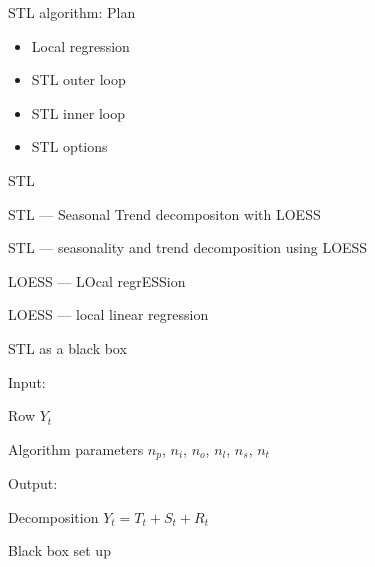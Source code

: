 
\begin{frame} %
	
	
\end{frame}



\begin{frame}{STL algorithm: Plan}
	\begin{itemize}[<+->]
		\item Local regression
		\item STL outer loop
		\item STL inner loop
		\item STL options
	\end{itemize}
	
\end{frame}


\begin{frame}{STL}
	
	\alert{STL} — Seasonal Trend decompositon with LOESS
	
	STL — seasonality and trend decomposition using LOESS
	
	\pause
	
	\alert{LOESS} — LOcal regrESSion
	
	LOESS — local linear regression
	
\end{frame}


\begin{frame}{STL as a black box}
	
	\alert{Input:}
	
	Row $Y_t$
	
	Algorithm parameters $n_p$, $n_i$, $n_o$, $n_l$, $n_s$, $n_t$
	
	\pause
	\alert{Output:}
	
	Decomposition $Y_t = T_t + S_t + R_t$
	
	\pause
	
	Black box set up
	
\end{frame}


